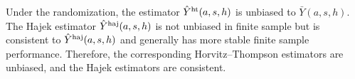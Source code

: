 \documentclass{article}
\newcommand{\pr}{\textup{pr}}
\newcommand{\sumi}{\sum_{i=1}^n}
\newcommand{\de}{\textsc{de}}
\newcommand{\bie}{\textsc{bie}}
\newcommand{\wie}{\textsc{wie}}
\newcommand{\horthom}{\textup{ht}}
\newcommand{\haj}{\textup{haj}}
\newcommand{\indicator}{\mathbbm{1}}
\begin{document}
Under the randomization, the estimator $\hat{Y}^{\horthom}(a,s,h)$ is unbiased to $\bar{Y}(a,s,h)$. The Hajek estimator $\hat{Y}^{\haj}(a,s,h)$ is not unbiased in finite sample but is consistent to $\hat{Y}^{\haj}(a,s,h)$ and generally has more stable finite sample performance. Therefore, the corresponding Horvitz--Thompson estimators are unbiased, and the Hajek estimators are consistent.

\end{document}
